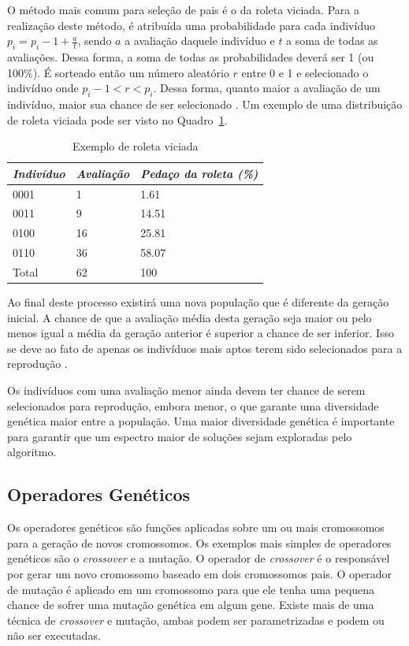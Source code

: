 \documentclass[12pt,oneside,a4paper,english,french,spanish,brazil,]{abntex2}
\begin{document}
O método mais comum para seleção de pais é o da roleta viciada. Para a realização deste método, é atribuída uma probabilidade para cada indivíduo \(p_i = p_i-1 + \frac{a}{t}\), sendo \(a\) a avaliação daquele indivíduo e \(t\) a soma de todas as avaliações. Dessa forma, a soma de todas as probabilidades deverá ser 1 (ou 100\%). É sorteado então um número aleatório \(r\) entre 0 e 1 e selecionado o indivíduo onde \(p_i-1 < r < p_i\). Dessa forma, quanto maior a avaliação de um indivíduo, maior sua chance de ser selecionado \cite{linden:2008}. Um exemplo de uma distribuição de roleta viciada pode ser visto no Quadro~\ref{tab:Roleta}.

\begin{table}
\centering
\caption{Exemplo de roleta viciada}
\label{tab:Roleta}
\begin{tabular}{lll}
\hline
\textit{\textbf{Indivíduo}} & \textit{\textbf{Avaliação}} & \textit{\textbf{Pedaço da roleta (\%)}} \\ \hline
0001      & 1         & 1.61                  \\
0011      & 9         & 14.51                 \\ 
0100      & 16        & 25.81                 \\ 
0110      & 36        & 58.07                 \\ 
Total     & 62        & 100                   \\ \hline
\end{tabular}
\end{table}

Ao final deste processo existirá uma nova população que é diferente da geração inicial. A chance de que a avaliação média desta geração seja maior ou pelo menos igual a média da geração anterior é superior a chance de ser inferior. Isso se deve ao fato de apenas os indivíduos mais aptos terem sido selecionados para a reprodução \cite{linden:2008}.

Os indivíduos com uma avaliação menor ainda devem ter chance de serem selecionados para reprodução, embora menor, o que garante uma diversidade genética maior entre a população. Uma maior diversidade genética é importante para garantir que um espectro maior de soluções sejam exploradas pelo algoritmo.

\subsection{Operadores Genéticos}

Os operadores genéticos são funções aplicadas sobre um ou mais cromossomos para a geração de novos cromossomos. Os exemplos mais simples de operadores genéticos são o \textit{crossover} e a mutação. O operador de \textit{crossover} é o responsável por gerar um novo cromossomo baseado em dois cromossomos pais. O operador de mutação é aplicado em um cromossomo para que ele tenha uma pequena chance de sofrer uma mutação genética em algum gene. Existe mais de uma técnica de \textit{crossover} e mutação, ambas podem ser parametrizadas e podem ou não ser executadas.
\end{document}
